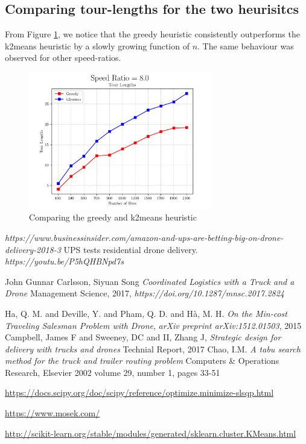 \documentclass[conference]{IEEEtran}
\begin{document}
\subsection{Comparing tour-lengths for the two heurisitcs}

From Figure \ref{fig:compareheuristics}, we notice that the greedy heuristic
consistently outperforms the k2means heuristic by a slowly growing function
of $n$. The same behaviour was observed for other speed-ratios.

\begin{figure}[h!]
\centering
\includegraphics[width=8cm]{img/uniform_points/file_tour_lengths_00001.png}
\caption{Comparing the greedy and k2means heuristic}
\label{fig:compareheuristics}
\end{figure}


\begin{thebibliography}{1}
   \textit{https://www.businessinsider.com/amazon-and-ups-are-betting-big-on-drone-delivery-2018-3}
   UPS tests residential drone delivery. \textit{https://youtu.be/P5hQHBNpd7s}

   John Gunnar Carlsson, Siyuan Song
   \textit{Coordinated Logistics with a Truck and a Drone} 
   Management Science, 2017, \textit{https://doi.org/10.1287/mnsc.2017.2824}

  Ha, Q. M. and Deville, Y. and Pham, Q. D. and H{\`a}, M. H.
  \textit{On the Min-cost Traveling Salesman Problem with Drone},
  \textit{arXiv preprint arXiv:1512.01503}, 2015
  Campbell, James F and Sweeney, DC and II, Zhang J,
  \textit{Strategic design for delivery with trucks and drones}
  Technial Report, 2017
  Chao, I.M.
  \textit{A tabu search method for the truck and trailer routing problem}
  Computers \& Operations Research, Elsevier  2002 volume 29, number 1, pages 33-51

  \href{https://docs.scipy.org/doc/scipy/reference/optimize.minimize-slsqp.html}{https://docs.scipy.org/doc/scipy/reference/optimize.minimize-slsqp.html} 

  \href{https://www.mosek.com/}{https://www.mosek.com/}
  
  \href{http://scikit-learn.org/stable/modules/generated/sklearn.cluster.KMeans.html}{http://scikit-learn.org/stable/modules/generated/sklearn.cluster.KMeans.html}


  
\end{thebibliography}
\end{document}
